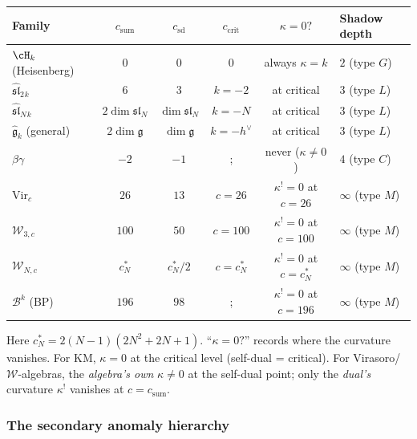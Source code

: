 \begin{computation}

\begin{center}
\renewcommand{\arraystretch}{1.3}
\begin{tabular}{lccccl}
\textbf{Family} & $c_{\mathrm{sum}}$ & $c_{\mathrm{sd}}$ &
$c_{\mathrm{crit}}$ & $\kappa = 0?$ & \textbf{Shadow depth} \\
\hline
$\cH_k$ (Heisenberg) & $0$ & $0$ & $0$ & always $\kappa = k$
& $2$ (type $G$) \\
$\widehat{\mathfrak{sl}}_2{}_k$ & $6$ & $3$ & $k = -2$ &
at critical & $3$ (type $L$) \\
$\widehat{\mathfrak{sl}}_N{}_k$ & $2\dim\mathfrak{sl}_N$
& $\dim\mathfrak{sl}_N$ & $k = -N$ & at critical &
$3$ (type $L$) \\
$\widehat{\mathfrak{g}}_k$ (general) & $2\dim\mathfrak{g}$
& $\dim\mathfrak{g}$ & $k = -h^\vee$ & at critical &
$3$ (type $L$) \\
$\beta\gamma$ & $-2$ & $-1$ &; & never ($\kappa \neq 0$)
& $4$ (type $C$) \\
$\mathrm{Vir}_c$ & $26$ & $13$ & $c = 26$ & $\kappa^! = 0$ at $c = 26$
& $\infty$ (type $M$) \\
$\mathcal{W}_{3,c}$ & $100$ & $50$ & $c = 100$ &
$\kappa^! = 0$ at $c = 100$ & $\infty$ (type $M$) \\
$\mathcal{W}_{N,c}$ & $c_N^*$ & $c_N^*/2$ & $c = c_N^*$ &
$\kappa^! = 0$ at $c = c_N^*$ & $\infty$ (type $M$) \\
$\mathcal{B}^k$ (BP) & $196$ & $98$ &; &
$\kappa^! = 0$ at $c = 196$ & $\infty$ (type $M$)
\end{tabular}
\end{center}

Here $c_N^* = 2(N-1)(2N^2+2N+1)$.
``$\kappa = 0?$'' records where the curvature vanishes.
For KM, $\kappa = 0$ at the critical level (self-dual = critical).
For Virasoro/$\mathcal{W}$-algebras, the \emph{algebra's own}
$\kappa \neq 0$ at the self-dual point; only the
\emph{dual's} curvature $\kappa^!$ vanishes at $c = c_{\mathrm{sum}}$.
\end{computation}

\subsubsection{The secondary anomaly hierarchy}

